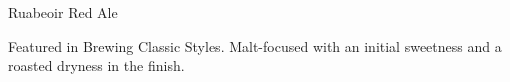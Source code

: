 \documentclass[parskip=half,fontsize=9pt,oneside]{scrbook}
\begin{document}
\mainmatter


\begin{recipe}{Ruabeoir Red Ale}

\begin{aboutblock}
Featured in Brewing Classic Styles. Malt-focused with an initial sweetness and a
roasted dryness in the finish. \sourceaha
\end{aboutblock}


\begin{methodandtiming}

\begin{mashsteps}
\end{mashsteps}

\begin{fermentationsteps}
\end{fermentationsteps}

\end{methodandtiming}

\recipebreak

\begin{ingredientsblock}

\begin{malts}
\end{malts}

\begin{hops}
\end{hops}


\end{ingredientsblock}

\end{recipe}


\end{document}
